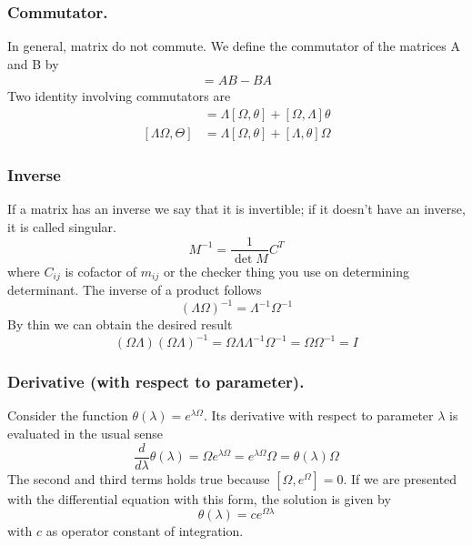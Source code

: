 \documentclass[../main.tex]{subfiles}
\begin{document}
\subsubsection*{Commutator.}
In general, matrix do not commute. We define the commutator of the matrices A and B by
\begin{align*}
	[A, B] = AB - BA
\end{align*}
Two identity involving commutators are
\begin{align*}
	[\Omega,\Lambda\theta] & =\Lambda[\Omega,\theta]+[\Omega,\Lambda]\theta \\
	[\Lambda\Omega,\Theta] & =\Lambda[\Omega,\theta]+[\Lambda,\theta]\Omega
\end{align*}

\subsubsection*{Inverse}
If a matrix has an inverse we say that it is invertible; if it doesn't have an inverse, it is called singular.
\begin{equation*}
	M^{-1}=\frac{1}{\det M}C^{T}
\end{equation*}
where $C_{ij}$ is cofactor of $m_{ij}$ or the checker thing you use on determining determinant.
The inverse of a product follows
\begin{equation*}
	(\Lambda\Omega)^{-1}=\Lambda^{-1}\Omega^{-1}
\end{equation*}
By thin we can obtain the desired result
\begin{equation*}
	(\Omega\Lambda)(\Omega\Lambda)^{-1}=\Omega\Lambda\Lambda^{-1}\Omega^{-1}=\Omega\Omega^{-1}=I
\end{equation*}

\subsubsection*{Derivative (with respect to parameter).}
Consider the function $\theta(\lambda)=e^{\lambda\Omega}$.
Its derivative with respect to parameter $\lambda$ is evaluated in the usual sense
\begin{equation*}
	\frac{d}{d\lambda}\theta(\lambda)=\Omega e^{\lambda\Omega}=e^{\lambda\Omega}\Omega=\theta(\lambda)\Omega
\end{equation*}
The second and third terms holds true because $[\Omega,e^{\Omega}]=0$.
If we are presented with the differential equation with this form, the solution is given by
\begin{equation*}
	\theta(\lambda)=ce^{\Omega \lambda}
\end{equation*}
with $c$ as operator constant of integration.
\end{document}
